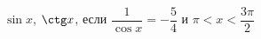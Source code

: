 \begin{ex}[type=calculate]
	\begin{condition}
		\( \sin x \), \( \ctg x \), \quad если \( \dfrac{1}{\cos x}=-\dfrac{5}{4} \) и \( \pi<x<\dfrac{3\pi}{2} \)
	\end{condition}
\end{ex}